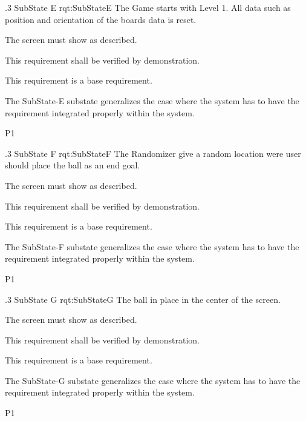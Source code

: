 \ONERQMTV
{\RqtNumberBase.3}
{SubState E}
{rqt:SubStateE}
{The Game starts with Level 1. All data such as position and orientation of the boards data is reset.}
{
	\item [Phase 1] The screen must show as described.
}
{This requirement shall be verified by demonstration.}
{
	\item [N/A] This requirement is a base requirement.
}
{
	\item The SubState-E substate generalizes the case where the system has to have the requirement integrated properly within the system.
}
{P1}

\ONERQMTV
{\RqtNumberBase.3}
{SubState F}
{rqt:SubStateF}
{The Randomizer give a random location were user should place the ball as an end goal.}
{
	\item [Phase 1] The screen must show as described.
}
{This requirement shall be verified by demonstration.}
{
	\item [N/A] This requirement is a base requirement.
}
{
	\item The SubState-F substate generalizes the case where the system has to have the requirement integrated properly within the system.
}
{P1}

\ONERQMTV
{\RqtNumberBase.3}
{SubState G}
{rqt:SubStateG}
{The ball in place in the center of the screen. }
{
	\item [Phase 1] The screen must show as described.
}
{This requirement shall be verified by demonstration.}
{
	\item [N/A] This requirement is a base requirement.
}
{
	\item The SubState-G substate generalizes the case where the system has to have the requirement integrated properly within the system.
}
{P1}

